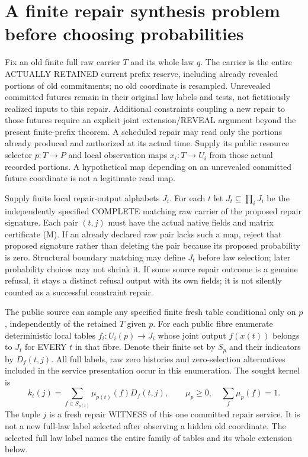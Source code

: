 \documentclass[11pt]{article}
\begin{document}
\section{A finite repair synthesis problem before choosing probabilities}
Fix an old finite full raw carrier $T$ and its whole law $q$. The carrier is the entire ACTUALLY RETAINED current prefix reserve, including already revealed portions of old commitments; no old coordinate is resampled. Unrevealed committed futures remain in their original law labels and tests, not fictitiously realized inputs to this repair. Additional constraints coupling a new repair to those futures require an explicit joint extension/REVEAL argument beyond the present finite-prefix theorem. A scheduled repair may read only the portions already produced and authorized at its actual time. Supply its public resource selector $p:T\to P$ and local observation maps $x_i:T\to U_i$ from those actual recorded portions. A hypothetical map depending on an unrevealed committed future coordinate is not a legitimate read map.

Supply finite local repair-output alphabets $J_i$. For each $t$ let $J_t\subseteq\prod_iJ_i$ be the independently specified COMPLETE matching raw carrier of the proposed repair signature. Each pair $(t,j)$ must have the actual native fields and matrix certificate (M). If an already declared raw pair lacks such a map, reject that proposed signature rather than deleting the pair because its proposed probability is zero. Structural boundary matching may define $J_t$ before law selection; later probability choices may not shrink it. If some source repair outcome is a genuine refusal, it stays a distinct refusal output with its own fields; it is not silently counted as a successful constraint repair.

The public source can sample any specified finite fresh table conditional only on $p$, independently of the retained $T$ given $p$. For each public fibre enumerate deterministic local tables $f_i:U_i(p)\to J_i$ whose joint output $f(x(t))$ belongs to $J_t$ for EVERY $t$ in that fibre. Denote their finite set by $S_p$ and their indicators by $D_f(t,j)$. All full labels, raw zero histories and zero-selection alternatives included in the service presentation occur in this enumeration. The sought kernel is
\[
 k_t(j)=\sum_{f\in S_{p(t)}}\mu_{p(t)}(f)D_f(t,j),
 \qquad\mu_p\geq0,\quad\sum_f\mu_p(f)=1.
\tag{K}
\]
The tuple $j$ is a fresh repair WITNESS of this one committed repair service. It is not a new full-law label selected after observing a hidden old coordinate. The selected full law label names the entire family of tables and its whole extension below.
\end{document}
